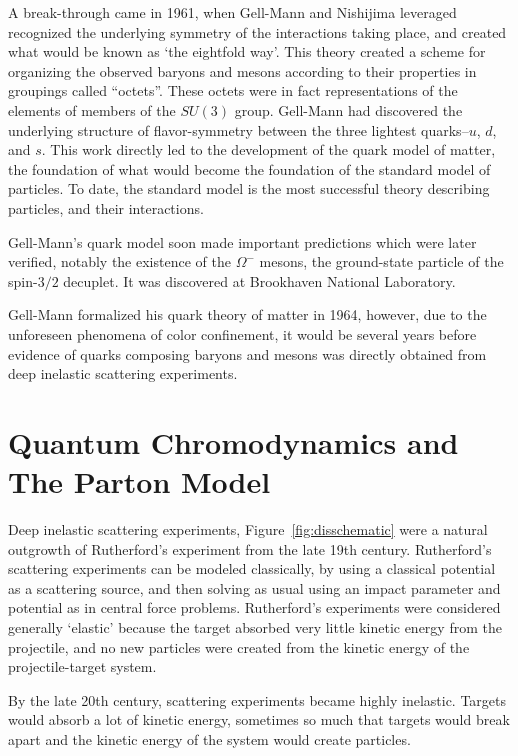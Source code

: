 A break-through came in 1961, when Gell-Mann and Nishijima leveraged recognized
the underlying symmetry of the interactions taking place, and created what would
be known as `the eightfold way'. This theory created a scheme for organizing the
observed baryons and mesons according to their properties in groupings called
``octets''. These octets were in fact representations of the elements of members
of the $SU(3)$ group. Gell-Mann had discovered the underlying structure of
flavor-symmetry between the three lightest quarks--$u$, $d$, and $s$. This work
directly led to the development of the quark model of matter, the foundation of
what would become the foundation of the standard model of particles. To date,
the standard model is the most successful theory describing particles, and their
interactions.

Gell-Mann's quark model soon made important predictions which were later
verified, notably the existence of the $\Omega^{-}$ mesons, the ground-state
particle of the spin-$3/2$ decuplet. It was discovered at Brookhaven National
Laboratory. 

Gell-Mann formalized his quark theory of matter in 1964, however, due to the
unforeseen phenomena of color confinement, it would be several years before
evidence of quarks composing baryons and mesons was directly obtained from deep
inelastic scattering experiments.

\clearpage
\section{Quantum Chromodynamics and The Parton Model}

Deep inelastic scattering experiments, Figure~\ref{fig:disschematic} were a
natural outgrowth of Rutherford's experiment from the late 19th century.
Rutherford's scattering experiments can be modeled classically, by using a
classical potential as a scattering source, and then solving as usual using an
impact parameter and potential as in central force problems.  Rutherford's
experiments were considered generally `elastic' because the target absorbed very
little kinetic energy from the projectile, and no new particles were created
from the kinetic energy of the projectile-target system.

By the late 20th century, scattering experiments became highly inelastic.
Targets would absorb a lot of kinetic energy, sometimes so much that targets
would break apart and the kinetic energy of the system would create particles.

